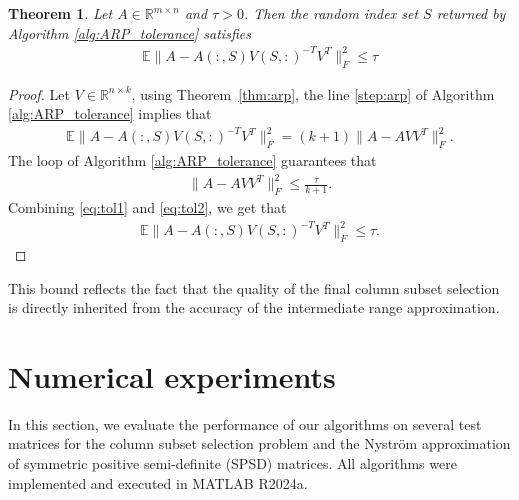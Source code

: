 \documentclass[11pt]{article}
\newtheorem{theorem}{Theorem}[section]
\newcommand{\be}{\begin{eqnarray}}
\newcommand{\ee}{\end{eqnarray}}
\newcommand{\R}{\mathbb{R}}
\newcommand{\Rmn}{\mathbb{R}^{m\times n}}
\newcommand{\<}{\langle}
\renewcommand{\>}{\rangle}
\begin{document}
\begin{theorem}
\label{thm:arp_tol}
    Let $A\in\Rmn$ and $\tau > 0$. Then the random
index set $S$ returned by Algorithm \ref{alg:ARP_tolerance} satisfies
\be
\mathbb{E}\|A - A(:,S)V(S,:)^{-T}V^T\|_F^2 \leq \tau
\ee
\end{theorem}
\begin{proof}
    Let $V\in \R^{n\times k}$, using Theorem~\ref{thm:arp}, the line \ref{step:arp} of Algorithm \ref{alg:ARP_tolerance} implies that
    \be
    \label{eq:tol1}
    \mathbb{E}\|A - A(:,S)V(S,:)^{-T}V^T\|_F^2 = (k+1) \|A - AVV^T \|_F^2.
    \ee
    The loop of Algorithm \ref{alg:ARP_tolerance} guarantees that 
    \be
    \label{eq:tol2}
    \|A - AVV^T \|_F^2 \leq \frac \tau {k+1}.
    \ee
    Combining \eqref{eq:tol1} and \eqref{eq:tol2}, we get that
    \be
    \mathbb{E}\|A - A(:,S)V(S,:)^{-T}V^T\|_F^2 \leq \tau.
    \ee
\end{proof}
This bound reflects the fact that the quality of the final column subset selection is directly inherited from the accuracy of the intermediate range approximation.

%
\section{Numerical experiments}
\label{sec:numerics}
 
In this section, we evaluate the performance of our algorithms on several test matrices for
the column subset selection problem and the Nystr\"{o}m approximation of symmetric
positive semi-definite (SPSD) matrices. All algorithms were implemented and executed in
MATLAB R2024a. 
\end{document}
